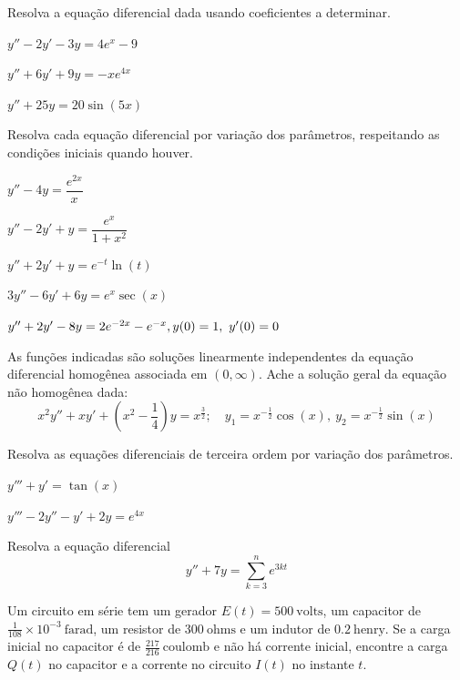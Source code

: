 \documentclass[oneside,12pt,a4paper]{report}
\begin{document}
 Resolva a equação diferencial dada usando coeficientes a determinar.
\begin{itensquestao}[2]
    \item $y''-2y'-3y=4e^x-9$
    \item $y''+6y'+9y=-xe^{4x}$
    \item $y''+25y=20\sin(5x)$
\end{itensquestao}

 Resolva cada equação diferencial por variação dos parâmetros, respeitando as condições iniciais quando houver.
\begin{itensquestao}[2]
    \item $y''-4y=\dfrac{e^{2x}}{x}$
    \item $y''-2y'+y=\dfrac{e^{x}}{1+x^2}$
    \item $y''+2y'+y=e^{-t}\ln(t)$
    \item $3y''-6y'+6y=e^x\sec(x)$
    \item $y''+2y'-8y=2e^{-2x}-e^{-x},\\ y(0)=1,~y'(0)=0$
\end{itensquestao}

 As funções indicadas são soluções linearmente independentes da equação diferencial homogênea associada em $(0,\infty)$. Ache a solução geral da equação não homogênea dada:
\[x^2y''+xy'+\left(x^2-\frac{1}{4}\right)y=x^\frac{3}{2};\quad y_1=x^{-\frac{1}{2}}\cos(x),~y_2=x^{-\frac{1}{2}}\sin(x)\]

 Resolva as equações diferenciais de terceira ordem por variação dos parâmetros.
\begin{itensquestao}[2]
    \item $y'''+y'=\tan(x)$
    \item $y'''-2y''-y'+2y=e^{4x}$
\end{itensquestao}

\exercicio[] Resolva a equação diferencial
\[y''+7y=\sum_{k=3}^{n}e^{3kt}\]

\exercicio[] Um circuito em série tem um gerador $E(t)=500~\mathrm{volts}$, um capacitor de $\frac{1}{108}\times10^{-3}~\mathrm{farad}$, um resistor de $300~\mathrm{ohms}$ e um indutor de $0.2~\mathrm{henry}$. Se a carga inicial no capacitor é de $\frac{217}{216}~\mathrm{coulomb}$ e não há corrente inicial, encontre a carga $Q(t)$ no capacitor e a corrente no circuito $I(t)$ no instante $t$.
    
\end{document}
